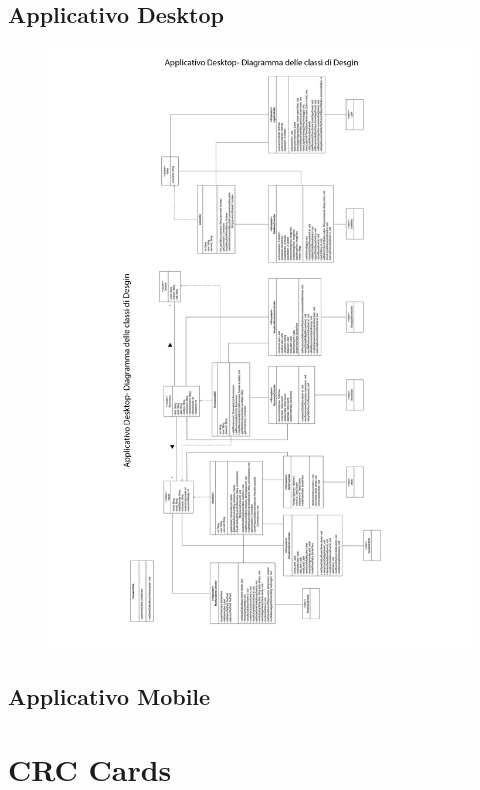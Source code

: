\subsection{Applicativo Desktop}
\begin{figure}[h!]
    \includegraphics[width=\textwidth]{SequenceAnalisi/12.png}
\end{figure}
\pagebreak

\subsection{Applicativo Mobile}
\section{CRC  Cards}
